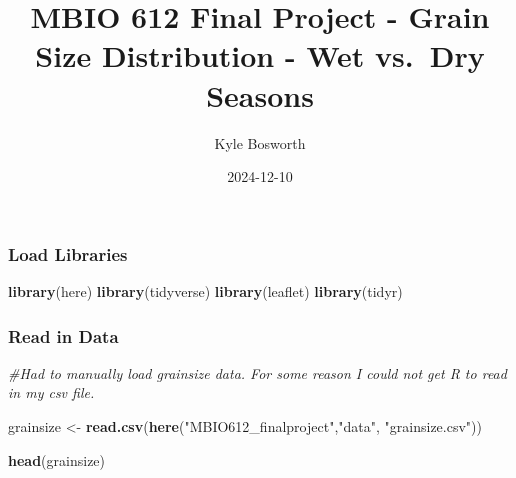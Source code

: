 \documentclass[
]{article}
\title{MBIO 612 Final Project - Grain Size Distribution - Wet vs.~Dry
Seasons}
\author{Kyle Bosworth}
\date{2024-12-10}
\newenvironment{Shaded}{\begin{snugshade}}{\end{snugshade}}
\newcommand{\CommentTok}[1]{\textcolor[rgb]{0.56,0.35,0.01}{\textit{#1}}}
\newcommand{\FunctionTok}[1]{\textcolor[rgb]{0.13,0.29,0.53}{\textbf{#1}}}
\newcommand{\NormalTok}[1]{#1}
\newcommand{\OtherTok}[1]{\textcolor[rgb]{0.56,0.35,0.01}{#1}}
\newcommand{\StringTok}[1]{\textcolor[rgb]{0.31,0.60,0.02}{#1}}
\begin{document}
\maketitle

{
\setcounter{tocdepth}{2}
\tableofcontents
}
\subsubsection{Load Libraries}\label{load-libraries}

\begin{Shaded}
\begin{Highlighting}[]
\FunctionTok{library}\NormalTok{(here)}
\FunctionTok{library}\NormalTok{(tidyverse)}
\FunctionTok{library}\NormalTok{(leaflet)}
\FunctionTok{library}\NormalTok{(tidyr)}
\end{Highlighting}
\end{Shaded}

\subsubsection{Read in Data}\label{read-in-data}

\begin{Shaded}
\begin{Highlighting}[]
\CommentTok{\#Had to manually load grainsize data. For some reason I could not get R to read in my csv file.}


\NormalTok{grainsize }\OtherTok{\textless{}{-}} \FunctionTok{read.csv}\NormalTok{(}\FunctionTok{here}\NormalTok{(}\StringTok{"MBIO612\_finalproject"}\NormalTok{,}\StringTok{"data"}\NormalTok{, }\StringTok{"grainsize.csv"}\NormalTok{))}

\FunctionTok{head}\NormalTok{(grainsize)}
\end{Highlighting}
\end{Shaded}
\end{document}
